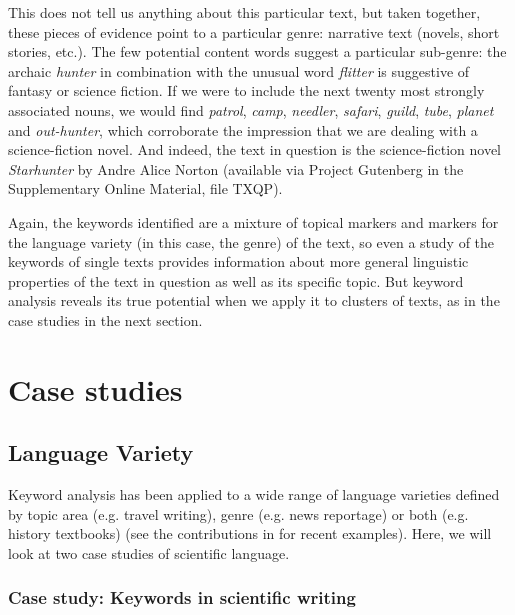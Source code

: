This does not tell us anything about this particular text, but taken together, these pieces of evidence point to a particular genre:  narrative text (novels,  short stories, etc.). The few potential content words suggest a particular sub\hyp{}genre: the archaic \textit{hunter} in combination with the unusual word \textit{flitter} is suggestive of fantasy or science fiction. If we were to include the next twenty most strongly associated  nouns,  we would find \textit{patrol}, \textit{camp}, \textit{needler}, \textit{safari}, \textit{guild}, \textit{tube}, \textit{planet} and \textit{out\hyp{}hunter}, which corroborate the impression that we are dealing with a science\hyp{}fiction  novel. And indeed, the text in question is the science\hyp{}fiction novel \textit{Starhunter} by Andre Alice Norton (available via Project Gutenberg in the Supplementary Online Material, file TXQP).

Again, the keywords  identified are a mixture of topical markers and markers for the language variety  (in this case, the genre)  of the text, so even a study of the keywords of single texts provides information about more general linguistic properties of the text in question as well as its specific topic. But keyword  analysis reveals its true potential when we apply it to clusters of texts, as in the case studies in the next section.

\section{Case studies}
\label{sec:keywordcasestudies}

\subsection{Language Variety}
\label{sec:texttype}

Keyword  analysis has been applied to a wide range of language varieties  defined by topic area (e.g. travel writing), genre  (e.g. news reportage)  or both (e.g. history textbooks) (see the contributions in \citealt{bondi_keyness_2010} for recent examples). Here, we will look at two case studies of scientific language.

\subsubsection{Case study: Keywords in scientific writing}
\label{sec:keywordsinscientificwriting}

